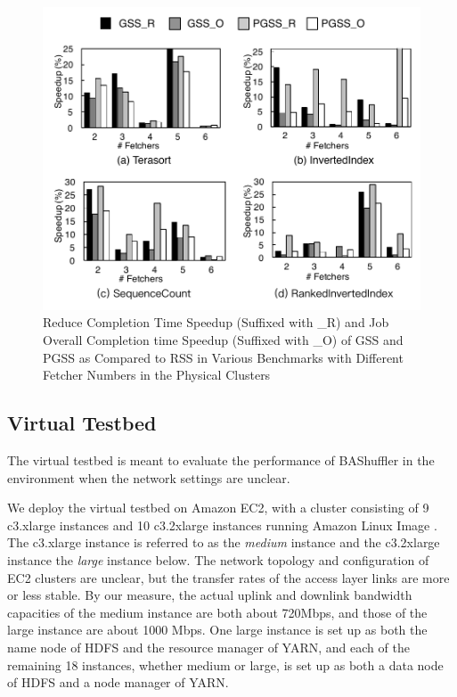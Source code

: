\documentclass[10pt,journal,compsoc]{IEEEtran}
\begin{document}
\begin{figure}[!t]
\centering
\includegraphics[width=1\columnwidth]{figure8}
\caption{Reduce Completion Time Speedup (Suffixed with \_R) and Job Overall Completion time Speedup (Suffixed with \_O) of GSS and PGSS as Compared to RSS in Various Benchmarks with Different Fetcher Numbers
in the Physical Clusters}
\label{fig:new_speedup}
\end{figure}

\subsection{Virtual Testbed}\label{section:virtualTestbed}
The virtual testbed is meant to evaluate the performance of BAShuffler in the environment when the network settings are unclear. 

We deploy the virtual testbed on Amazon EC2, with a cluster consisting of 9 c3.xlarge
instances and 10 c3.2xlarge instances running
Amazon Linux Image \cite{aws}. The c3.xlarge instance is referred to as the \emph{medium} instance 
and the c3.2xlarge instance the \emph{large} instance below. 
The network topology and configuration of EC2 clusters are unclear, 
but the transfer rates of the access layer links are more or less stable. 
By our measure, the actual uplink and downlink bandwidth capacities of
the medium instance are both about 720Mbps, 
and those of the large instance are about 1000 Mbps. 
One large instance is set up as both the name node of HDFS and the
resource manager of YARN,
and each of the remaining 18 instances, whether medium or large,
is set up as both a data node of HDFS and a node manager of YARN. 
\end{document}
